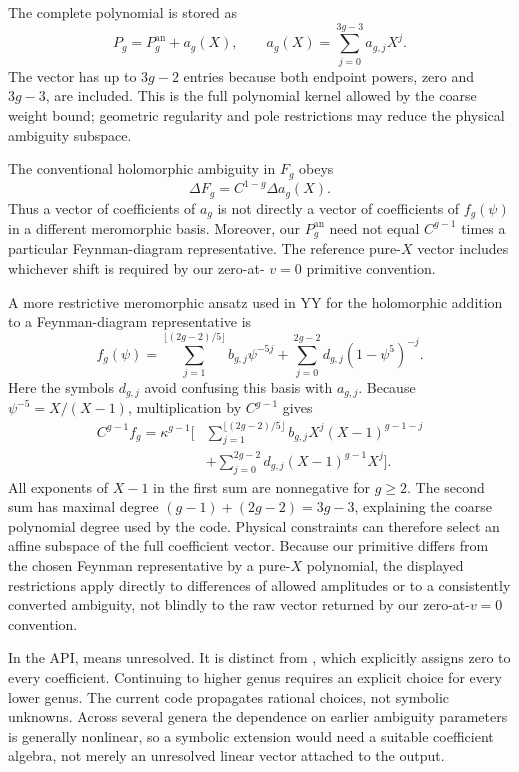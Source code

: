 \documentclass[11pt,a4paper]{article}
\numberwithin{equation}{section}
\newcommand{\an}{\mathrm{an}}
\newcommand{\code}[1]{\texttt{\detokenize{#1}}}
\begin{document}
The complete polynomial is stored as
\begin{equation}
P_g=P_g^{\an}+a_g(X),\qquad
a_g(X)=\sum_{j=0}^{3g-3}a_{g,j}X^j.
\end{equation}
The vector has up to $3g-2$ entries because both endpoint powers, zero and
$3g-3$, are included. This is the full polynomial kernel allowed by the coarse
weight bound; geometric regularity and pole restrictions may reduce the physical
ambiguity subspace.

The conventional holomorphic ambiguity in $F_g$ obeys
\begin{equation}
\Delta F_g=C^{1-g}\Delta a_g(X).
\end{equation}
Thus a vector of coefficients of $a_g$ is not directly a vector of coefficients
of $f_g(\psi)$ in a different meromorphic basis. Moreover, our $P_g^{\an}$ need
not equal $C^{g-1}$ times a particular Feynman-diagram representative. The
reference pure-$X$ vector includes whichever shift is required by our zero-at-
$v=0$ primitive convention.

A more restrictive meromorphic ansatz used in YY for the holomorphic addition
to a Feynman-diagram representative is
\begin{equation}
f_g(\psi)=\sum_{j=1}^{\lfloor(2g-2)/5\rfloor}b_{g,j}\psi^{-5j}
          +\sum_{j=0}^{2g-2}d_{g,j}(1-\psi^5)^{-j}.
\end{equation}
Here the symbols $d_{g,j}$ avoid confusing this basis with $a_{g,j}$.
Because $\psi^{-5}=X/(X-1)$, multiplication by $C^{g-1}$ gives
\begin{align}
C^{g-1}f_g=\kappa^{g-1}\bigg[&
 \sum_{j=1}^{\lfloor(2g-2)/5\rfloor}
       b_{g,j}X^j(X-1)^{g-1-j}\\
 &+\sum_{j=0}^{2g-2}d_{g,j}(X-1)^{g-1}X^j\bigg].
\end{align}
All exponents of $X-1$ in the first sum are nonnegative for $g\ge2$.
The second sum has maximal degree $(g-1)+(2g-2)=3g-3$, explaining
the coarse polynomial degree used by the code. Physical constraints can
therefore select an affine subspace of the full coefficient vector.
Because our primitive differs from the chosen Feynman representative by a
pure-$X$ polynomial, the displayed restrictions apply directly to differences
of allowed amplitudes or to a consistently converted ambiguity, not blindly
to the raw vector returned by our zero-at-$v=0$ convention.

In the API, \code{ambiguity=None} means unresolved. It is distinct from
\code{ambiguity=()}, which explicitly assigns zero to every coefficient.
Continuing to higher genus requires an explicit choice for every lower genus.
The current code propagates rational choices, not symbolic unknowns. Across
several genera the dependence on earlier ambiguity parameters is generally
nonlinear, so a symbolic extension would need a suitable coefficient algebra,
not merely an unresolved linear vector attached to the output.
\end{document}
